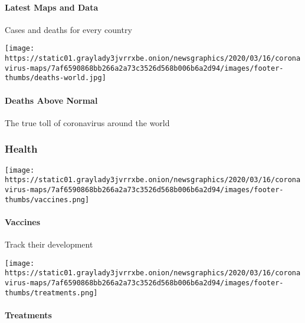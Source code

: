 \hypertarget{latest-maps-and-data-1}{%
\paragraph{Latest Maps and Data}\label{latest-maps-and-data-1}}

Cases and deaths for every country

\href{https://www.nytimes3xbfgragh.onion/interactive/2020/04/21/world/coronavirus-missing-deaths.html}{}

\texttt{[image: https://static01.graylady3jvrrxbe.onion/newsgraphics/2020/03/16/coronavirus-maps/7af6590868bb266a2a73c3526d568b006b6a2d94/images/footer-thumbs/deaths-world.jpg]}

\hypertarget{deaths-above-normal-1}{%
\paragraph{Deaths Above Normal}\label{deaths-above-normal-1}}

The true toll of coronavirus around the world

\hypertarget{health}{%
\subsubsection{Health}\label{health}}

\href{https://www.nytimes3xbfgragh.onion/interactive/2020/science/coronavirus-vaccine-tracker.html}{}

\texttt{[image: https://static01.graylady3jvrrxbe.onion/newsgraphics/2020/03/16/coronavirus-maps/7af6590868bb266a2a73c3526d568b006b6a2d94/images/footer-thumbs/vaccines.png]}

\hypertarget{vaccines}{%
\paragraph{Vaccines}\label{vaccines}}

Track their development

\href{https://www.nytimes3xbfgragh.onion/interactive/2020/science/coronavirus-drugs-treatments.html}{}

\texttt{[image: https://static01.graylady3jvrrxbe.onion/newsgraphics/2020/03/16/coronavirus-maps/7af6590868bb266a2a73c3526d568b006b6a2d94/images/footer-thumbs/treatments.png]}

\hypertarget{treatments}{%
\paragraph{Treatments}\label{treatments}}

